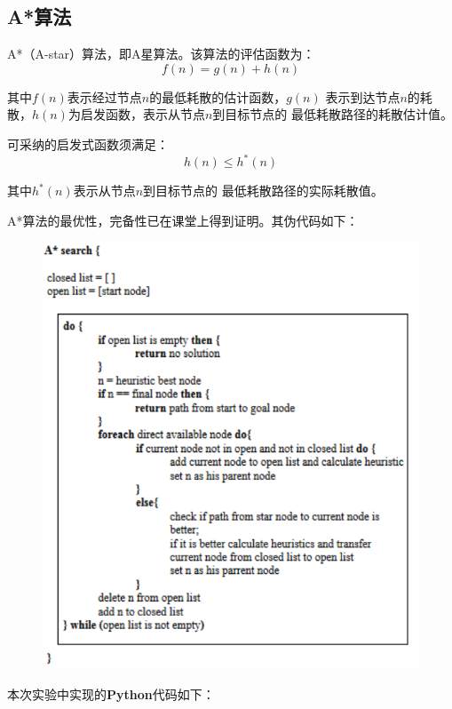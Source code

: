\documentclass{ctexart}
\begin{document}
\subsection{\hei A*算法}
A*（A-star）算法，即A星算法。该算法的评估函数为：
$$f\left(n\right)=g\left(n\right)+h\left(n\right)$$\par
其中$f\left(n\right)$表示经过节点$n$的最低耗散的估计函数，$g\left(n\right)$
表示到达节点$n$的耗散，$h\left(n\right)$为启发函数，表示从节点$n$到目标节点的
最低耗散路径的耗散估计值。
\par 可采纳的启发式函数须满足：
$$h\left(n\right)\leq  h^{*}\left(n\right)$$\par
其中$h^{*}\left(n\right)$表示从节点$n$到目标节点的
最低耗散路径的实际耗散值。\par 
A*算法的最优性，完备性已在课堂上得到证明。其伪代码如下：
\begin{figure}[htbp]	
	\centering	
	\includegraphics[scale=0.37]{astar.png}
		
\end{figure}
\par 本次实验中实现的\textbf{Python}代码如下：
\end{document}
